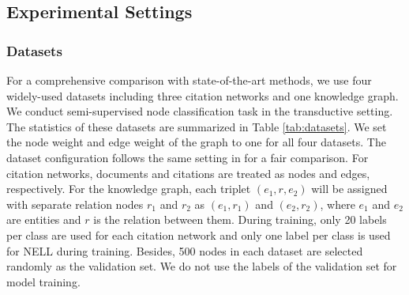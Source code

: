 \documentclass{article}
\begin{document}
\subsection{Experimental Settings}

\subsubsection{Datasets}

For a comprehensive comparison with state-of-the-art methods, we use four widely-used datasets including three citation networks and one knowledge graph. We conduct semi-supervised node classification task in the transductive setting. The statistics of these datasets are summarized in Table \ref{tab:datasets}. We set the node weight and edge weight of the graph to one for all four datasets. The dataset configuration follows the same setting in \cite{pmlr-v48-yanga16,Kipf:2016tc} for a fair comparison. For citation networks, documents and citations are treated as nodes and edges, respectively. For the knowledge graph, each triplet $(e_1, r, e_2)$ will be assigned with separate relation nodes $r_1$ and $r_2$ as $(e_1, r_1)$ and $(e_2, r_2)$, where $e_1$ and $e_2$ are entities and $r$ is the relation between them. During training, only 20 labels per class are used for each citation network and only one label per class is used for NELL during training. Besides, 500 nodes in each dataset are selected randomly as the validation set. We do not use the labels of the validation set for model training.

\begin{table}
	\centering
	\caption{Statistics of datasets used in experiments}
	\label{tab:datasets}
\end{table}
\end{document}
